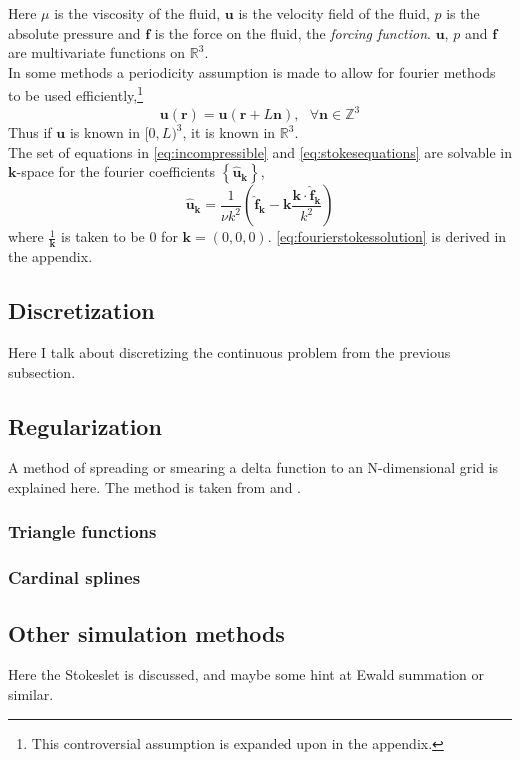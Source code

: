 \documentclass[a4paper,twoside=false,abstract=false,numbers=noenddot,
titlepage=false,headings=small,parskip=half,version=last]{scrartcl}
\begin{document}
Here $\mu$ is the viscosity of the fluid, $\mathbf{u}$ is the velocity field of the fluid, $p$ is the absolute pressure and $\mathbf{f}$ is the force on the fluid, the \emph{forcing function}. $\mathbf{u}$, $p$ and $\mathbf{f}$ are multivariate functions on $\mathbb{R}^3$.\\
In some methods a periodicity assumption is made to allow for fourier methods to be used efficiently,\footnote{This controversial assumption is expanded upon in the appendix.}
\begin{equation}
\mathbf{u}(\mathbf{r}) = \mathbf{u}(\mathbf{r}+L\mathbf{n}),\text{ }\forall \mathbf{n} \in \mathbb{Z}^3
\end{equation}
Thus if $\mathbf{u}$ is known in $[0,L)^3$, it is known in $\mathbb{R}^3$.\\
The set of equations in \eqref{eq:incompressible} and \eqref{eq:stokesequations} are solvable in $\mathbf{k}$-space for the fourier coefficients $\left\{\hat{\mathbf{u}}_\mathbf{k}\right\}$,
\begin{equation}
\hat{\mathbf{u}}_\mathbf{k} = \frac{1}{\nu k^2} \left( \hat{\mathbf{f}}_\mathbf{k} - \mathbf{k} \frac{\mathbf{k}\cdot \hat{\mathbf{f}}_\mathbf{k}}{k^2} \right) \label{eq:fourierstokessolution}
\end{equation}
where $\frac{1}{\mathbf{k}}$ is taken to be $0$ for $\mathbf{k}=(0,0,0)$. \eqref{eq:fourierstokessolution} is derived in the appendix.
\subsection{Discretization}
Here I talk about discretizing the continuous problem from the previous subsection.

\subsection{Regularization}
A method of spreading or smearing a delta function to an N-dimensional grid is explained here. The method is taken from \cite{spectralewald} and \cite{interfaceregularization}.
\subsubsection{Triangle functions}
\subsubsection{Cardinal splines}

\subsection{Other simulation methods}
Here the Stokeslet is discussed, and maybe some hint at Ewald summation or similar.
\end{document}
